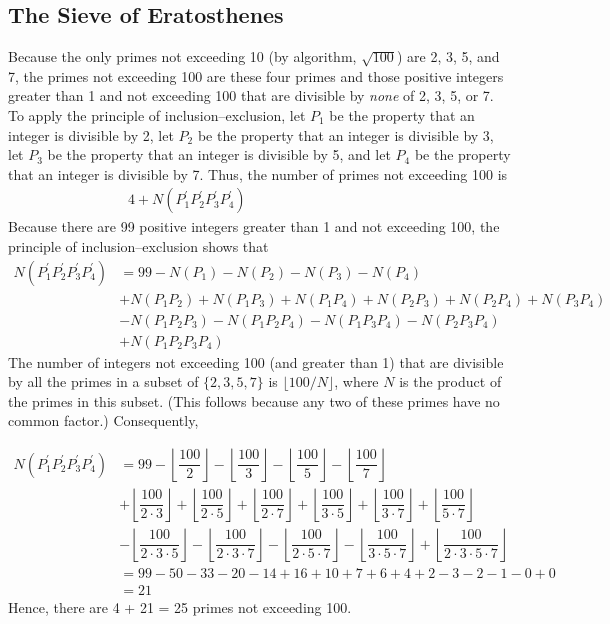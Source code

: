 \documentclass[11pt]{article}
\begin{document}
\subsection{The Sieve of Eratosthenes}

Because the only primes not exceeding 10 (by algorithm, $\sqrt{100}$) are 2, 3, 5, and 7, the primes not exceeding 100 are these four primes and those positive integers greater than 1 and not exceeding 100 that are divisible by \textit{none} of 2, 3, 5, or 7. To apply the principle of inclusion–exclusion, let $P_1$ be the property that an integer is divisible by 2, let $P_2$ be the property that an integer is divisible by 3, let $P_3$ be the property that an integer is divisible by 5, and let $P_4$ be the property that an integer is divisible by 7. Thus, the number of primes not exceeding 100 is
\begin{align*}
    4 + N(P_1^{'}P_2^{'}P_3^{'}P_4^{'})&&&&&&&&&&&&&
\end{align*}
Because there are 99 positive integers greater than 1 and not exceeding 100, the principle of inclusion–exclusion shows that
\begin{align*}
    N(P_1^{'}P_2^{'}P_3^{'}P_4^{'}) &= 99 - N(P_1) - N(P_2) - N(P_3) - N(P_4)\\
    &+ N(P_1P_2) + N(P_1P_3) + N(P_1P_4) + N(P_2P_3) + N(P_2P_4) + N(P_3P_4)\\
    &- N(P_1P_2P_3) - N(P_1P_2P_4) - N(P_1P_3P_4) - N(P_2P_3P_4)\\
    &+ N(P_1P_2P_3P_4)
\end{align*}
The number of integers not exceeding 100 (and greater than 1) that are divisible by all the primes in a subset of $\{2, 3, 5, 7\}$ is $\lfloor 100/N \rfloor$, where $N$ is the product of the primes in this subset. (This follows because any two of these primes have no common factor.) Consequently,

\begin{align*}
    N(P_1^{'}P_2^{'}P_3^{'}P_4^{'}) &= 99 - \left\lfloor\dfrac{100}{2}\right\rfloor - \left\lfloor\dfrac{100}{3}\right\rfloor - \left\lfloor\dfrac{100}{5}\right\rfloor - \left\lfloor\dfrac{100}{7}\right\rfloor\\
    &+ \left\lfloor\dfrac{100}{2\cdot3}\right\rfloor + \left\lfloor\dfrac{100}{2\cdot5}\right\rfloor + \left\lfloor\dfrac{100}{2\cdot7}\right\rfloor + \left\lfloor\dfrac{100}{3\cdot5}\right\rfloor + 
    \left\lfloor\dfrac{100}{3\cdot7}\right\rfloor + \left\lfloor\dfrac{100}{5\cdot7}\right\rfloor\\
    &- \left\lfloor\dfrac{100}{2\cdot3\cdot5}\right\rfloor - \left\lfloor\dfrac{100}{2\cdot3\cdot7}\right\rfloor - \left\lfloor\dfrac{100}{2\cdot5\cdot7}\right\rfloor - \left\lfloor\dfrac{100}{3\cdot5\cdot7}\right\rfloor + \left\lfloor\dfrac{100}{2\cdot3\cdot5\cdot7}\right\rfloor\\
    &= 99 - 50 - 33 - 20 - 14 + 16 + 10 + 7 + 6 + 4 + 2 - 3 - 2 - 1 - 0 + 0\\
    &= 21
\end{align*}
Hence, there are 4 + 21 = 25 primes not exceeding 100.
\end{document}
